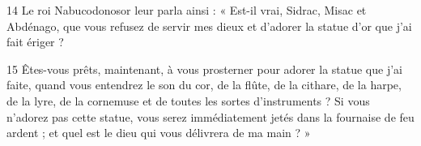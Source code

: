 14 Le roi Nabucodonosor leur parla ainsi : « Est-il vrai, Sidrac, Misac et Abdénago, que vous refusez de servir mes dieux et d’adorer la statue d’or que j’ai fait ériger ?

15 Êtes-vous prêts, maintenant, à vous prosterner pour adorer la statue que j’ai faite, quand vous entendrez le son du cor, de la flûte, de la cithare, de la harpe, de la lyre, de la cornemuse et de toutes les sortes d’instruments ? Si vous n’adorez pas cette statue, vous serez immédiatement jetés dans la fournaise de feu ardent ; et quel est le dieu qui vous délivrera de ma main ? »

